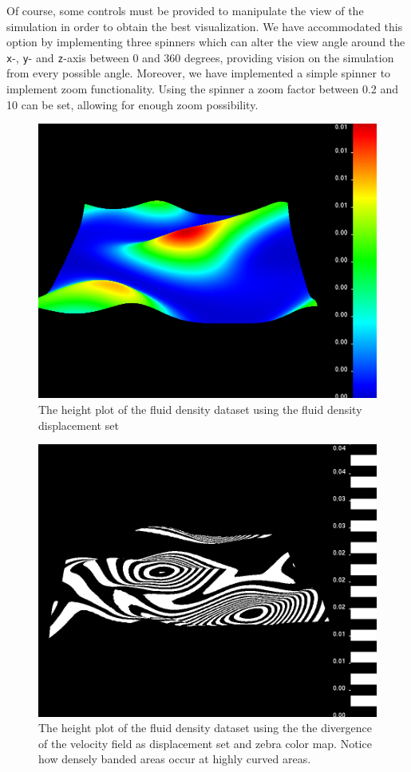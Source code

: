 Of course, some controls must be provided to manipulate the view of the simulation in order to obtain the best visualization. 
We have accommodated this option by implementing three spinners which can alter the view angle around the \texttt{x}-, \texttt{y}- and \texttt{z}-axis between 0 and 360 degrees, providing vision on the simulation from every possible angle.
Moreover, we have implemented a simple spinner to implement zoom functionality. 
Using the spinner a zoom factor between 0.2 and 10 can be set, allowing for enough zoom possibility.
\begin{figure}[htb]
	  \centering
	  \includegraphics[width=\linewidth]{./content/pictures/heightplot.png}
	  \caption{The height plot of the fluid density dataset using the fluid density displacement set}
	  \label{fig:height_same}
\end{figure}
\begin{figure}[htb]
	  \centering
	  \includegraphics[width=\linewidth]{./content/pictures/heightplot_diff.png}
	  \caption{The height plot of the fluid density dataset using the the divergence of the velocity field as displacement set and zebra color map. Notice how densely banded areas occur at highly curved areas.}
	  \label{fig:height_diff}
\end{figure}

